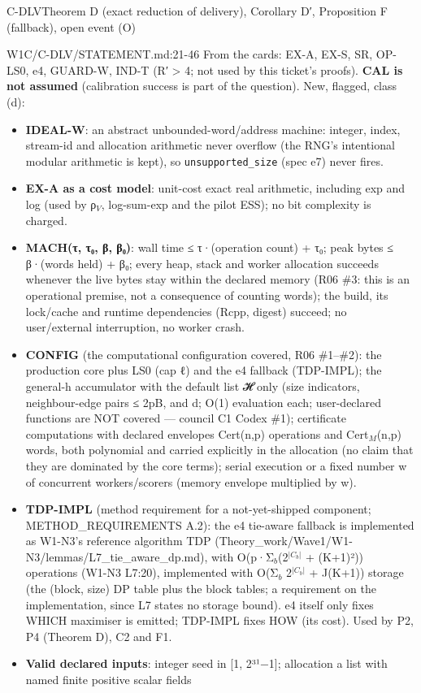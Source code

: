 \begin{card}{C-DLV}{Theorem D (exact reduction of delivery), Corollary D′, Proposition F (fallback), open event (O)}
\begin{stmt}{W1C/C-DLV/STATEMENT.md:21-46}
From the cards: EX-A, EX-S, SR, OP-LS0, e4, GUARD-W, IND-T (R′ > 4; not used by this ticket's proofs). \textbf{CAL is not assumed} (calibration success is
part of the question). New, flagged, class (d):
\begin{itemize}
\item \textbf{IDEAL-W}: an abstract unbounded-word/address machine: integer, index, stream-id and allocation arithmetic never
  overflow (the RNG's intentional modular arithmetic is kept), so \texttt{unsupported\_size} (spec e7) never fires.
\item \textbf{EX-A as a cost model}: unit-cost exact real arithmetic, including exp and log (used by ρ$_{V}$, log-sum-exp and the
  pilot ESS); no bit complexity is charged.
\item \textbf{MACH(τ, τ₀, β, β₀)}: wall time ≤ τ·(operation count) + τ₀; peak bytes ≤ β·(words held) + β₀; every heap, stack
  and worker allocation succeeds whenever the live bytes stay within the declared memory (R06 \#3: this is an
  operational premise, not a consequence of counting words); the build, its lock/cache and runtime dependencies
  (Rcpp, digest) succeed; no user/external interruption, no worker crash.
\item \textbf{CONFIG} (the computational configuration covered, R06 \#1–\#2): the production core plus LS0 (cap ℓ) and the e4
  fallback (TDP-IMPL); the general-h accumulator with the default list 𝓗 only (size indicators, neighbour-edge pairs
  ≤ 2pB, and d; O(1) evaluation each; user-declared functions are NOT covered — council C1 Codex \#1); certificate
  computations with declared envelopes Cert(n,p) operations and Cert$_{M}$(n,p) words, both polynomial and carried
  explicitly in the allocation (no claim that they are dominated by the core terms); serial execution or a fixed number w of concurrent workers/scorers
  (memory envelope multiplied by w).
\item \textbf{TDP-IMPL} (method requirement for a not-yet-shipped component; METHOD\_REQUIREMENTS A.2): the e4 tie-aware
  fallback is implemented as W1-N3's reference algorithm TDP (Theory\_work/Wave1/W1-N3/lemmas/L7\_tie\_aware\_dp.md), with
  O(p·Σ$_{b}$(2$^{|C_{b}|}$ + (K+1)²)) operations (W1-N3 L7:20), implemented with O(Σ$_{b}$ 2$^{|C_{b}|}$ + J(K+1)) storage (the
  (block, size) DP table plus the block tables; a requirement on the implementation, since L7 states no storage bound). e4 itself only fixes WHICH maximiser is
  emitted; TDP-IMPL fixes HOW (its cost). Used by P2, P4 (Theorem D), C2 and F1.
\item \textbf{Valid declared inputs}: integer seed in [1, 2³¹−1]; allocation a list with named finite positive scalar fields

\end{itemize}
\end{stmt}
\end{card}
